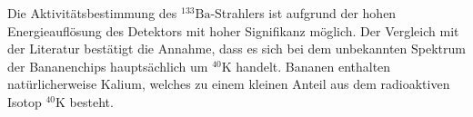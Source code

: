 Die Aktivitätsbestimmung des $^{133}\text{Ba}$-Strahlers ist aufgrund der hohen Energieauflösung des Detektors mit hoher Signifikanz möglich.
Der Vergleich mit der Literatur \cite{Bundesamt} bestätigt die Annahme, dass es sich bei dem unbekannten Spektrum der Bananenchips 
hauptsächlich um $^{40}\text{K}$ handelt. Bananen enthalten natürlicherweise Kalium, welches zu einem kleinen Anteil 
aus dem radioaktiven Isotop $^{40}\text{K}$ besteht.

\nocite{wingate}
\nocite{*}
\printbibliography

